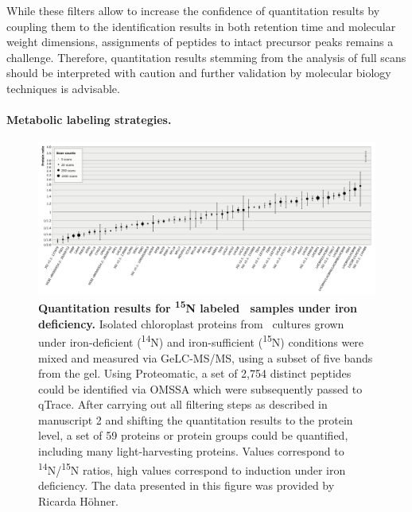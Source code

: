 While these filters allow to increase the confidence of quantitation results
by coupling them to the identification results in both retention time and
molecular weight dimensions, assignments of peptides to intact precursor
peaks remains a challenge.
Therefore, quantitation results stemming from the analysis of full scans
should be interpreted with caution and further validation by molecular
biology techniques is advisable.

\paragraph{Metabolic labeling strategies.}

\begin{figure}
\includegraphics[width=\textwidth]{figures/qtrace-diagram.jpg}
\caption{
{\bf Quantitation results for \textsuperscript{15}N labeled \cre~samples
    under iron deficiency.} 
    Isolated chloroplast proteins from \cre~cultures grown under 
    iron-deficient (\textsuperscript{14}N) and iron-sufficient
    (\textsuperscript{15}N) conditions were mixed and measured via
    GeLC-MS/MS, using a subset of five bands from the gel.
    Using Proteomatic, a set of 2,754 distinct peptides could be identified
    via OMSSA which were subsequently passed to qTrace. 
    After carrying out all filtering steps as described in manuscript 2
    and shifting the quantitation results to the protein level,
    a set of 59 proteins or protein groups could be quantified,
    including many light-harvesting proteins.
    Values correspond to \textsuperscript{14}N/\textsuperscript{15}N ratios,
    high values correspond to induction under iron deficiency.
    The data presented in this figure was provided by Ricarda H\"ohner.
}
\label{fig:qtrace-15n}
\end{figure}

